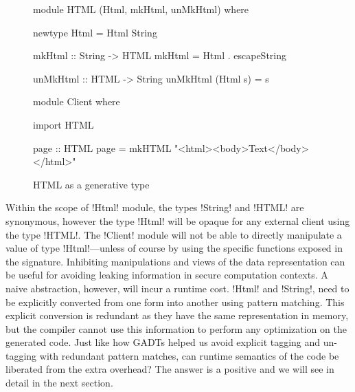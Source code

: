 \documentclass[screen,nonacm,manuscript,review]{acmart} %
\begin{document}
\begin{figure}[ht]
\centering
\begin{minipage}[ht]{0.5\linewidth}
\begin{CenteredBox}
\begin{code}
module HTML (Html, mkHtml, unMkHtml)
where

newtype Html = Html String

mkHtml :: String -> HTML
mkHtml = Html . escapeString

unMkHtml :: HTML -> String
unMkHtml (Html s) = s
\end{code}
\end{CenteredBox}
\end{minipage}%
\begin{minipage}[ht]{0.5\linewidth}
\begin{CenteredBox}
\begin{code}
module Client
where

import HTML

page :: HTML
page = mkHTML "<html><body>Text</body></html>"





\end{code}
\end{CenteredBox}
\end{minipage}
\caption{HTML as a generative type}
\label{fig:html-generative-type}
\end{figure}

Within the scope of !Html! module, the types !String! and !HTML! are
synonymous, however the type !Html! will be opaque for any
external client using the type !HTML!. The !Client! module will not be
able to directly manipulate a value of type !Html!---unless
of course by using the specific functions exposed in the
signature. Inhibiting manipulations and views of the data
representation can be useful for avoiding leaking information in
secure computation contexts. A naive abstraction, however,
will incur a runtime cost. !Html! and !String!, need to be explicitly
converted from one form into another using pattern matching.
This explicit conversion is redundant as they have the same
representation in memory, but the compiler cannot use this
information to perform any optimization on the generated code.
Just like how GADTs helped us avoid explicit tagging and un-tagging
with redundant pattern matches, can runtime semantics of the code
be liberated from the extra overhead? The answer is a positive and we
will see in detail in the next section.
\end{document}

